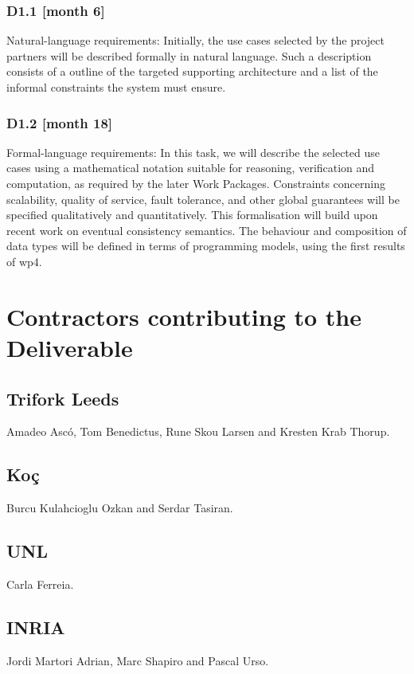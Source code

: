 \documentclass[12pt,twoside]{article}
\begin{document}
\subsubsection{D1.1 [month 6]}
Natural-language requirements: Initially, the use cases selected by the project partners will be described formally in natural language. Such a description consists of a outline of the targeted supporting architecture and a list of the informal constraints the system must ensure.



\subsubsection{D1.2 [month 18]}
Formal-language requirements: In this task, we will describe the selected use cases using a mathematical notation suitable for reasoning, verification and computation, as required by the later Work Packages. Constraints concerning scalability, quality of service, fault tolerance, and other global guarantees will be specified qualitatively and quantitatively. This formalisation will build upon recent work on eventual consistency semantics. The behaviour and composition of data types will be defined in terms of programming models, using the first results of \gls{wp4}.


\section{Contractors contributing to the Deliverable}

\subsection{Trifork Leeds}
Amadeo Asc\'{o}, Tom Benedictus, Rune Skou Larsen and Kresten Krab Thorup.


\subsection{Ko\c{c}}
Burcu Kulahcioglu Ozkan and Serdar Tasiran.


\subsection{UNL}
Carla Ferreia.


\subsection{INRIA}
Jordi Martori Adrian, Marc Shapiro and Pascal Urso.
\end{document}
